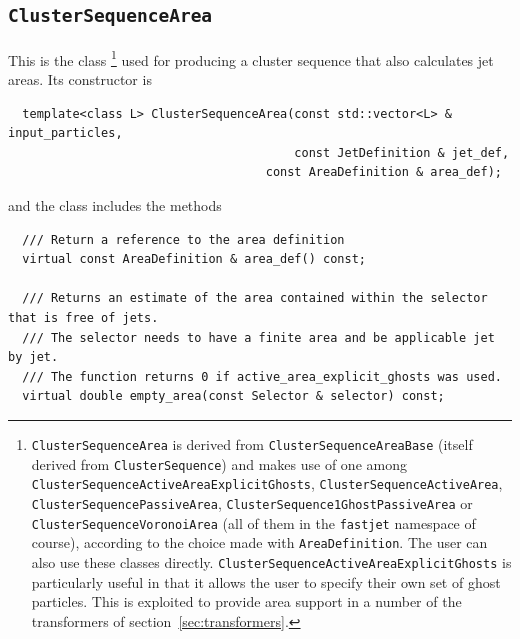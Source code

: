 \documentclass[12pt,a4]{article}
\begin{document}
\subsection{\tt ClusterSequenceArea}

This is the class
%
\footnote{  
  \texttt{ClusterSequenceArea} is derived from
  \texttt{ClusterSequenceAreaBase} (itself derived from
  \texttt{ClusterSequence}) and makes use of one among
  \texttt{ClusterSequenceActiveAreaExplicitGhosts}, 
  \texttt{ClusterSequenceActiveArea}, 
  \texttt{ClusterSequencePassiveArea},
  \texttt{ClusterSequence1GhostPassiveArea} or 
  \texttt{ClusterSequenceVoronoiArea} (all of them in the \texttt{fastjet}
  namespace of course), according to the choice
  made with \texttt{AreaDefinition}. The user can also use these
  classes directly.
  \texttt{ClusterSequenceActiveAreaExplicitGhosts} is particularly
  useful in that it allows the user to specify their own set of ghost
  particles.
  This is exploited to provide area support in a number of the
  transformers of section~\ref{sec:transformers}.
}
%
used for producing a cluster sequence that also calculates jet areas.
Its constructor is
\begin{lstlisting}
  template<class L> ClusterSequenceArea(const std::vector<L> & input_particles, 
                                        const JetDefinition & jet_def,
	                                const AreaDefinition & area_def);
\end{lstlisting}
and the class includes the methods
\begin{lstlisting}
  /// Return a reference to the area definition
  virtual const AreaDefinition & area_def() const; 

  /// Returns an estimate of the area contained within the selector that is free of jets. 
  /// The selector needs to have a finite area and be applicable jet by jet.
  /// The function returns 0 if active_area_explicit_ghosts was used.
  virtual double empty_area(const Selector & selector) const;
\end{lstlisting}
\end{document}
